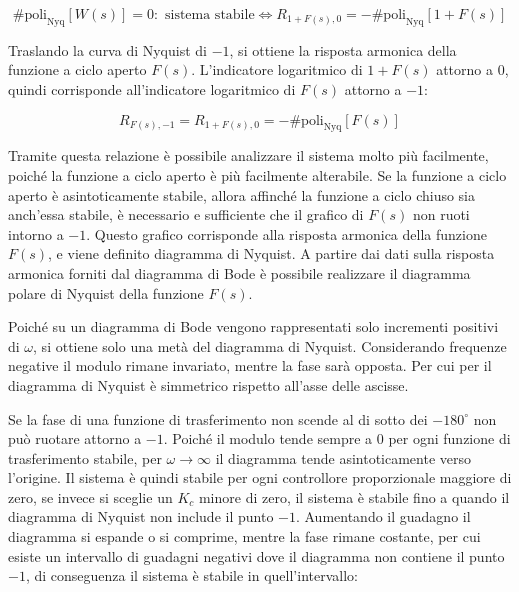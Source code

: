 \documentclass{article}
\numberwithin{equation}{subsection}
\begin{document}
\begin{equation}
    \#\mathrm{poli}_\mathrm{Nyq}[W(s)]=0:\mbox{ sistema stabile}\iff R_{1+F(s),0}=-\#\mathrm{poli}_\mathrm{Nyq}[1+F(s)]
\end{equation}

Traslando la curva di Nyquist di $-1$, si ottiene la risposta armonica della funzione a ciclo aperto $F(s)$. L'indicatore logaritmico di $1+F(s)$ attorno a $0$, quindi 
corrisponde all'indicatore logaritmico di $F(s)$ attorno a $-1$:

\begin{equation}
    R_{F(s),-1}=R_{1+F(s),0}=-\#\mathrm{poli}_\mathrm{Nyq}[F(s)]
\end{equation}

Tramite questa relazione è possibile analizzare il sistema molto più facilmente, poiché la funzione a ciclo aperto è più facilmente alterabile. Se la funzione a ciclo aperto 
è asintoticamente stabile, allora affinché la funzione a ciclo chiuso sia anch'essa stabile, è necessario e sufficiente che il grafico di $F(s)$ non ruoti 
intorno a $-1$. Questo grafico corrisponde alla risposta armonica della funzione $F(s)$, e viene definito diagramma di Nyquist. A partire dai dati sulla risposta armonica 
forniti dal diagramma di Bode è possibile realizzare il diagramma polare di Nyquist della funzione $F(s)$. 


Poiché su un diagramma di Bode vengono rappresentati solo incrementi positivi di $\omega$, si ottiene solo una metà del diagramma di Nyquist. Considerando frequenze negative 
il modulo rimane invariato, mentre la fase sarà opposta. Per cui per il diagramma di Nyquist è simmetrico rispetto all'asse delle ascisse.


Se la fase di una funzione di trasferimento non scende al di sotto dei $-180^{\circ}$ non può ruotare attorno a $-1$. Poiché il modulo tende sempre 
a $0$ per ogni funzione di trasferimento stabile, per $\omega\to\infty$ il diagramma tende asintoticamente verso l'origine. Il sistema è quindi stabile per ogni 
controllore proporzionale maggiore di zero, se invece si sceglie un $K_c$ minore di zero, il sistema è stabile fino a quando il diagramma di Nyquist non include il 
punto $-1$. Aumentando il guadagno il diagramma si espande o si comprime, mentre la fase rimane costante, per cui esiste un intervallo di guadagni negativi dove il 
diagramma non contiene il punto $-1$, di conseguenza il sistema è stabile in quell'intervallo: 
\end{document}
